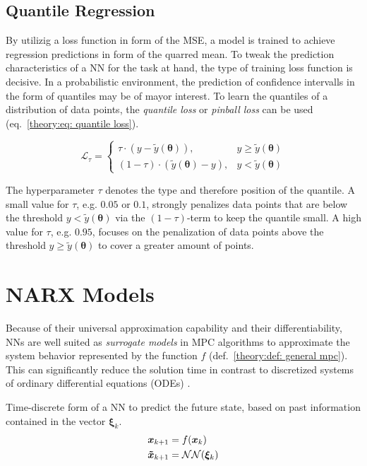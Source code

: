 \subsection{Quantile Regression}
By utilizig a loss function in form of the MSE, a model is trained to achieve regression predictions in form of the quarred mean.
To tweak the prediction characteristics of a NN for the task at hand, the type of training loss function is decisive.
In a probabilistic environment, the prediction of confidence intervalls in the form of quantiles may be of mayor interest.
To learn the quantiles of a distribution of data points, the \emph{quantile loss} or \emph{pinball loss} can be used (eq.~\ref{theory:eq: quantile loss}).

\begin{equation}
    \label{theory:eq: quantile loss}
    \mathcal{L}_\tau = 
    \begin{cases}
        \tau \cdot (y - \tilde{y}(\bm{\theta})), & y \geq \tilde{y}(\bm{\theta}) \\
        (1 - \tau) \cdot (\tilde{y}(\bm{\theta}) - y), &y < \tilde{y}(\bm{\theta})
    \end{cases}
\end{equation}

The hyperparameter $\tau$ denotes the type and therefore position of the quantile. A small value for $\tau$, e.g.
$0.05$ or $0.1$, strongly penalizes data points that are below the threshold $y < \tilde{y}(\bm{\theta})$ via the $(1-\tau)$-term
to keep the quantile small. A high value for $\tau$, e.g. $0.95$, focuses on the penalization of data points above
the threshold $y \geq \tilde{y}(\bm{\theta})$ to cover a greater amount of points.


\section{NARX Models}

Because of their universal approximation capability and their differentiability, NNs are well suited
as \emph{surrogate models} in MPC algorithms to approximate the system behavior represented by the function $f$ (def.~\ref{theory:def: general mpc}).
This can significantly reduce the solution time in contrast to discretized systems of ordinary differential equations (ODEs) \cite{}.
\begin{definition} Time-discrete form of a NN to predict the future state, based on past information contained in the vector $\bm{\xi}_k$.
    \label{theory:def: NARX Model}
    \[
    \begin{aligned}
        {\bm{x}}_{k+1} &= f({\bm{x}}_k) \\
        \bm{\tilde{x}}_{k+1} &= \mathcal{NN}(\bm{\xi}_k)
    \end{aligned}
    \]
\end{definition}



